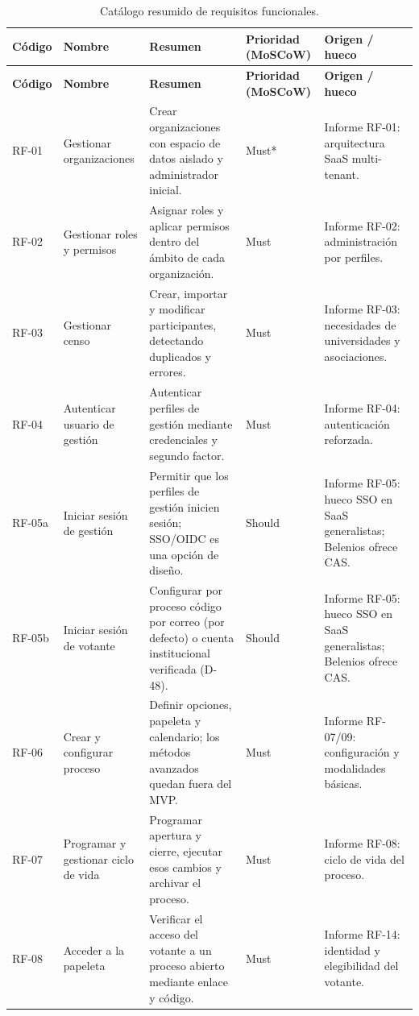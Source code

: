 \small
\setlength{\tabcolsep}{3.5pt}
\begin{longtable}{|p{}|p{}|p{}|p{}|p{}|}
\caption{Catálogo resumido de requisitos funcionales.}\label{tab:catalogo-rf}\\
\hline
\textbf{Código} & \textbf{Nombre} & \textbf{Resumen} & \textbf{Prioridad (MoSCoW)} & \textbf{Origen / hueco} \\
\hline
\endfirsthead
\hline
\textbf{Código} & \textbf{Nombre} & \textbf{Resumen} & \textbf{Prioridad (MoSCoW)} & \textbf{Origen / hueco} \\
\hline
\endhead
RF-01 & Gestionar organizaciones & Crear organizaciones con espacio de datos aislado y administrador inicial. & Must* & Informe RF-01: arquitectura SaaS multi-tenant. \\
\hline
RF-02 & Gestionar roles y permisos & Asignar roles y aplicar permisos dentro del ámbito de cada organización. & Must & Informe RF-02: administración por perfiles. \\
\hline
RF-03 & Gestionar censo & Crear, importar y modificar participantes, detectando duplicados y errores. & Must & Informe RF-03: necesidades de universidades y asociaciones. \\
\hline
RF-04 & Autenticar usuario de gestión & Autenticar perfiles de gestión mediante credenciales y segundo factor. & Must & Informe RF-04: autenticación reforzada. \\
\hline
RF-05a & Iniciar sesión de gestión & Permitir que los perfiles de gestión inicien sesión; SSO/OIDC es una opción de diseño. & Should & Informe RF-05: hueco SSO en SaaS generalistas; Belenios ofrece CAS. \\
\hline
RF-05b & Iniciar sesión de votante & Configurar por proceso código por correo (por defecto) o cuenta institucional verificada (D-48). & Should & Informe RF-05: hueco SSO en SaaS generalistas; Belenios ofrece CAS. \\
\hline
RF-06 & Crear y configurar proceso & Definir opciones, papeleta y calendario; los métodos avanzados quedan fuera del MVP. & Must & Informe RF-07/09: configuración y modalidades básicas. \\
\hline
RF-07 & Programar y gestionar ciclo de vida & Programar apertura y cierre, ejecutar esos cambios y archivar el proceso. & Must & Informe RF-08: ciclo de vida del proceso. \\
\hline
RF-08 & Acceder a la papeleta & Verificar el acceso del votante a un proceso abierto mediante enlace y código. & Must & Informe RF-14: identidad y elegibilidad del votante. \\

\end{longtable}
